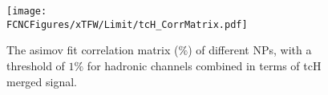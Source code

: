 
\begin{figure}[H]
\centering
\texttt{[image: \\FCNCFigures/xTFW/Limit/tcH\_CorrMatrix.pdf]}
\caption{ The asimov fit correlation matrix ($\%$) of different NPs, with a threshold of $1\%$ for hadronic channels combined in terms of tcH merged signal.}
\label{fig:tcH_CorrMatrix_1}
\end{figure}

